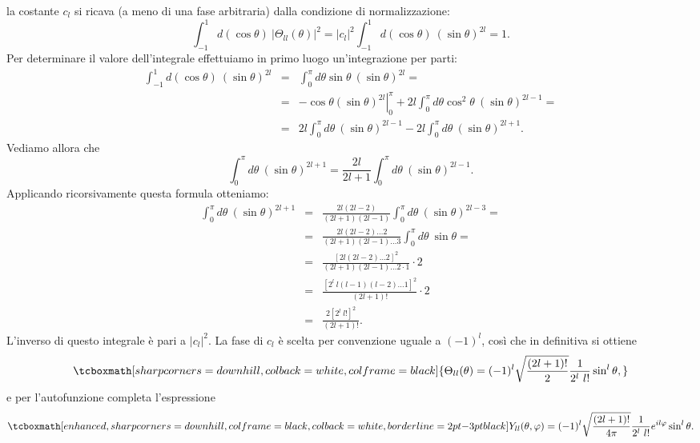 \documentclass[a4paper,12pt,oneside]{book}
\begin{document}
la costante $c_l$ si ricava (a meno di una fase arbitraria) dalla condizione di normalizzazione:
	\begin{equation}
		\int _{-1} ^1 d(\cos \theta )\ \vert \Theta _{ll} (\theta ) \vert ^2 = \vert c_l \vert ^2 \int _{-1} ^1 d(\cos \theta )\ \left( \sin \theta \right) ^{2l} =1.
	\end{equation}
Per determinare il valore dell'integrale effettuiamo in primo luogo un'integrazione per parti:
	\begin{eqnarray}
\int _{-1} ^1 d(\cos \theta )\ (\sin \theta ) ^{2l} 			&=& \int _{0} ^{\pi} d\theta \sin \theta\ (\sin \theta ) ^{2l} = \nonumber \\
		&=& \left. -\cos \theta (\sin \theta ) ^{2l} \right\vert _0 ^{\pi} +2l\int _{0} ^{\pi} d\theta \cos ^2 \theta \ (\sin \theta ) ^{2l-1} = \nonumber \\
		&=&  2l\int _{0} ^{\pi} d\theta \ (\sin \theta ) ^{2l-1} - 2l\int _{0} ^{\pi} d\theta  \ (\sin \theta ) ^{2l+1} .
	\end{eqnarray}
Vediamo allora che 
	\begin{equation}
		\int _{0} ^{\pi} d\theta \ (\sin \theta ) ^{2l+1}=\frac{2l}{2l+1} \int _{0} ^{\pi} d\theta \ (\sin \theta ) ^{2l-1}.
	\end{equation}
Applicando ricorsivamente questa formula otteniamo:
	\begin{eqnarray}
		\int _{0} ^{\pi} d\theta \ (\sin \theta ) ^{2l+1} & = & \frac{2l(2l-2)}{(2l+1)(2l-1)} \int _{0} ^{\pi} d\theta \ (\sin \theta ) ^{2l-3} = \nonumber \\
		&=& \frac{2l(2l-2)\dots 2}{(2l+1)(2l-1)\dots 3} \int _{0} ^{\pi} d\theta \ \sin \theta =\nonumber \\
		&=& \frac{[2l(2l-2)\dots 2]^2}{(2l+1)(2l-1)\dots 2\cdot 1}\cdot 2 \nonumber \\
		& = &  \frac{[2^l\ l(l-1)(l-2)\dots 1]^2}{(2l+1)!}\cdot 2 \nonumber \\
		&=& \frac{2[2^l\ l!]^2}{(2l+1)!}.
	\end{eqnarray}
L'inverso di questo integrale è pari a $\vert c_l \vert ^2$. La fase di $c_l$ è scelta per convenzione uguale a $(-1)^l$, così che in definitiva si ottiene
	\begin{equation}
		\tcboxmath[sharp corners=downhill, colback=white, colframe=black]{
			\Theta _{ll} (\theta ) = (-1)^l \sqrt{\frac{(2l+1)!}{2}}\frac{1}{2^l\ l!}\sin^l \theta ,
			}
	\end{equation}
e per l'autofunzione completa l'espressione
	\begin{equation}
		\tcboxmath[enhanced, sharp corners=downhill, colframe=black, colback=white, borderline={2pt}{-3pt}{black}]{
			Y_{ll} (\theta , \varphi) = (-1)^l \sqrt{\frac{(2l+1)!}{4\pi}}\frac{1}{2^l\ l!}e^{il\varphi} \sin ^l \theta  .
			}
	\end{equation}\\
	
\end{document}
